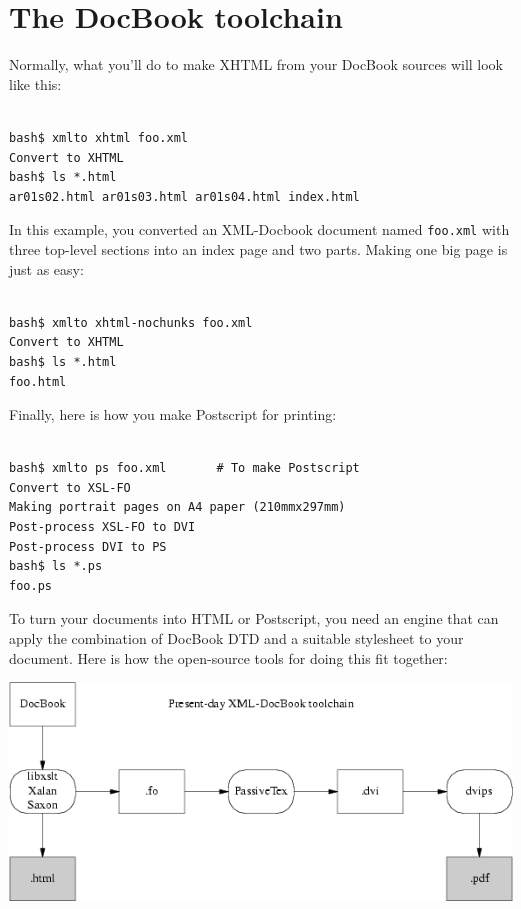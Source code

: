 \documentclass[pdftex,english,a4paper,10pt]{infocom}
\begin{document}
\section{The DocBook toolchain}
\label{id176329}\hypertarget{id176329}{}%

Normally, what you'll do to make XHTML from your
DocBook sources will look like this:

\begin{Verbatim}[]

bash$ xmlto xhtml foo.xml
Convert to XHTML
bash$ ls *.html
ar01s02.html ar01s03.html ar01s04.html index.html

\end{Verbatim}

In this example, you converted an XML-Docbook  document named 
{\texttt{{foo.xml}}} with three top-level sections into an
index page and two parts.  Making one big page is just as easy:

\begin{Verbatim}[]

bash$ xmlto xhtml-nochunks foo.xml
Convert to XHTML
bash$ ls *.html
foo.html

\end{Verbatim}

Finally, here is how you make Postscript for printing:

\begin{Verbatim}[]

bash$ xmlto ps foo.xml       # To make Postscript
Convert to XSL-FO
Making portrait pages on A4 paper (210mmx297mm)
Post-process XSL-FO to DVI
Post-process DVI to PS
bash$ ls *.ps
foo.ps

\end{Verbatim}

To turn your documents into HTML or Postscript, you need an
engine that can apply the combination of DocBook DTD and 
a suitable stylesheet to your document.  Here is how the 
open-source tools for doing this fit together:

{{\includegraphics[]{figure2.png}}}
\end{document}
